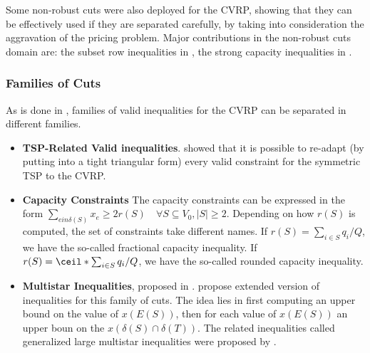 Some non-robust cuts were also deployed for the CVRP,
showing that they can be effectively used if they are separated
carefully, by taking into consideration the aggravation of the pricing problem.
Major contributions in the non-robust cuts domain are: the subset row inequalities in \textcite{jepsen2008a},
the strong capacity inequalities in \textcite{baldacci2008}.


\begin{comment}
\cite{toth2014}
Anyway, even if Ω only contains elementary routes, the bounds given by formulation
VRP4 (gaps between 1%
good enough to be the basis of efficient exact algorithms. For this purpose, VRP4 must be
reinforced with additional cuts. In fact, all the recent methods mentioned in Section 3.2
perform some kind of combined generation of both columns and cuts. Section 3.4 will
present the main families of cuts used in those methods. Some of those
\end{comment}


\subsubsection{Families of Cuts}

As is done in \textcite{toth2014}, families of valid inequalities for the CVRP can
be separated in different families.

\begin{itemize}
	\item \textbf{TSP-Related Valid inequalities}.
	      \textcite{naddef1993} showed that it is possible to re-adapt (by putting into a tight triangular form)
	      every valid constraint for the symmetric TSP to the CVRP.
	\item \textbf{Capacity Constraints}
	      The capacity constraints can be expressed in the form $\sum_{e in \delta(S)} x_e \ge 2 r(S) \quad \forall S \subseteq V_0, |S| \ge 2$.
	      Depending on how $r(S)$ is computed, the set of constraints take different names.
	      If $r(S) = \sum_{i \in S} q_i / Q$, we have the so-called fractional capacity inequality.
	      If $r(S) = \ceil*{\sum_{i \in S} q_i / Q}$, we have the so-called rounded capacity inequality.

	\item \textbf{Multistar Inequalities}, proposed in \textcite{araque1990}.
	      \textcite{letchford2002} propose extended version of inequalities for this family of cuts.
	      The idea lies in first computing an upper bound on the value of $x(E(S))$, then
	      for each value of $x(E(S))$ an upper boun on the $x(\delta(S) \cap \delta(T))$.
	      The related inequalities called generalized large multistar inequalities were proposed by \textcite{gouveia1995}.
\end{itemize}


